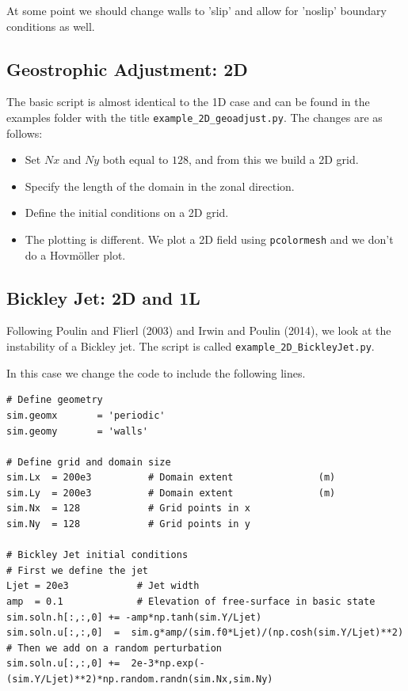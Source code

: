 \documentclass[11pt]{article}
\begin{document}
At some point we should change walls to 'slip' and allow for 'noslip' boundary conditions as well.

\subsection*{Geostrophic Adjustment: 2D}

The basic script is almost identical to the 1D case and can be found in the examples folder with the title {\tt example\_2D\_geoadjust.py}.  The changes are as follows:
\begin{itemize}
\item Set $Nx$ and $Ny$ both equal to $128$, and from this we build a 2D grid.   
\item Specify the length of the domain in the zonal direction.
\item Define the initial conditions on a 2D grid.
\item The plotting is different.  We plot a 2D field using {\tt pcolormesh} and we don't do a Hovm\"oller plot.
\end{itemize}

\subsection*{Bickley Jet: 2D and 1L}

Following Poulin and Flierl (2003) and Irwin and Poulin (2014), we look at the instability of a Bickley jet.  The script is called {\tt example\_2D\_BickleyJet.py}.

In this case we change the code to include the following lines.
\begin{lstlisting}
# Define geometry
sim.geomx       = 'periodic'
sim.geomy       = 'walls'

# Define grid and domain size
sim.Lx  = 200e3          # Domain extent               (m)
sim.Ly  = 200e3          # Domain extent               (m)
sim.Nx  = 128            # Grid points in x
sim.Ny  = 128            # Grid points in y

# Bickley Jet initial conditions
# First we define the jet
Ljet = 20e3            # Jet width
amp  = 0.1             # Elevation of free-surface in basic state
sim.soln.h[:,:,0] += -amp*np.tanh(sim.Y/Ljet)
sim.soln.u[:,:,0]  =  sim.g*amp/(sim.f0*Ljet)/(np.cosh(sim.Y/Ljet)**2)
# Then we add on a random perturbation
sim.soln.u[:,:,0] +=  2e-3*np.exp(-(sim.Y/Ljet)**2)*np.random.randn(sim.Nx,sim.Ny)
\end{lstlisting}

\end{document}

